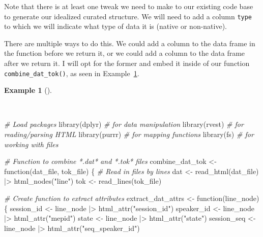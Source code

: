 \documentclass[
  letterpaper,
]{latex/krantz}
\newenvironment{Shaded}{\begin{snugshade}}{\end{snugshade}}
\newcommand{\CommentTok}[1]{\textcolor[rgb]{0.00,0.00,0.00}{\textit{#1}}}
\newcommand{\ControlFlowTok}[1]{\textcolor[rgb]{0.00,0.00,0.00}{#1}}
\newcommand{\FunctionTok}[1]{\textcolor[rgb]{0.00,0.00,0.00}{#1}}
\newcommand{\NormalTok}[1]{\textcolor[rgb]{0.00,0.00,0.00}{#1}}
\newcommand{\OtherTok}[1]{\textcolor[rgb]{0.00,0.00,0.00}{#1}}
\newcommand{\SpecialCharTok}[1]{\textcolor[rgb]{0.00,0.00,0.00}{#1}}
\newcommand{\StringTok}[1]{\textcolor[rgb]{0.00,0.00,0.00}{#1}}
\theoremstyle{definition}
\newtheorem{example}{Example}[chapter]
\theoremstyle{remark}
\begin{document}
Note that there is at least one tweak we need to make to our existing
code base to generate our idealized curated structure. We will need to
add a column \texttt{type} to which we will indicate what type of data
it is (native or non-native).

There are multiple ways to do this. We could add a column to the data
frame in the function before we return it, or we could add a column to
the data frame after we return it. I will opt for the former and embed
it inside of our function \texttt{combine\_dat\_tok()}, as seen in
Example~\ref{exm-cd-enntt-combine-dat-tok-function}.

\begin{example}[]\protect\hypertarget{exm-cd-enntt-combine-dat-tok-function}{}\label{exm-cd-enntt-combine-dat-tok-function}

~

\begin{Shaded}
\begin{Highlighting}[]
\CommentTok{\# Load packages}
\FunctionTok{library}\NormalTok{(dplyr) }\CommentTok{\# for data manipulation}
\FunctionTok{library}\NormalTok{(rvest) }\CommentTok{\# for reading/parsing HTML}
\FunctionTok{library}\NormalTok{(purrr) }\CommentTok{\# for mapping functions}
\FunctionTok{library}\NormalTok{(fs) }\CommentTok{\# for working with files}

\CommentTok{\# Function to combine *.dat* and *.tok* files}
\NormalTok{combine\_dat\_tok }\OtherTok{\textless{}{-}} \ControlFlowTok{function}\NormalTok{(dat\_file, tok\_file) \{}
  \CommentTok{\# Read in files by lines}
\NormalTok{  dat }\OtherTok{\textless{}{-}}
    \FunctionTok{read\_html}\NormalTok{(dat\_file) }\SpecialCharTok{|\textgreater{}}
    \FunctionTok{html\_nodes}\NormalTok{(}\StringTok{"line"}\NormalTok{)}
\NormalTok{  tok }\OtherTok{\textless{}{-}} \FunctionTok{read\_lines}\NormalTok{(tok\_file)}

  \CommentTok{\# Create function to extract attributes}
\NormalTok{  extract\_dat\_attrs }\OtherTok{\textless{}{-}} \ControlFlowTok{function}\NormalTok{(line\_node) \{}
\NormalTok{    session\_id }\OtherTok{\textless{}{-}}\NormalTok{ line\_node }\SpecialCharTok{|\textgreater{}} \FunctionTok{html\_attr}\NormalTok{(}\StringTok{"session\_id"}\NormalTok{)}
\NormalTok{    speaker\_id }\OtherTok{\textless{}{-}}\NormalTok{ line\_node }\SpecialCharTok{|\textgreater{}} \FunctionTok{html\_attr}\NormalTok{(}\StringTok{"mepid"}\NormalTok{)}
\NormalTok{    state }\OtherTok{\textless{}{-}}\NormalTok{ line\_node }\SpecialCharTok{|\textgreater{}} \FunctionTok{html\_attr}\NormalTok{(}\StringTok{"state"}\NormalTok{)}
\NormalTok{    session\_seq }\OtherTok{\textless{}{-}}\NormalTok{ line\_node }\SpecialCharTok{|\textgreater{}} \FunctionTok{html\_attr}\NormalTok{(}\StringTok{"seq\_speaker\_id"}\NormalTok{)}


\end{Highlighting}
\end{Shaded}
\end{example}
\end{document}
